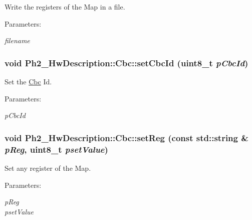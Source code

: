 Write the registers of the Map in a file. 

\begin{Desc}
\item[Parameters:]
\begin{description}
\item[{\em filename}]\end{description}
\end{Desc}
\hypertarget{class_ph2___hw_description_1_1_cbc_79864207a65830f49996220e612b00ae}{
\subsubsection[setCbcId]{\setlength{\rightskip}{0pt plus 5cm}void Ph2\_\-Hw\-Description::Cbc::set\-Cbc\-Id (uint8\_\-t {\em p\-Cbc\-Id})}}
\label{class_ph2___hw_description_1_1_cbc_79864207a65830f49996220e612b00ae}


Set the \hyperlink{class_ph2___hw_description_1_1_cbc}{Cbc} Id. 

\begin{Desc}
\item[Parameters:]
\begin{description}
\item[{\em p\-Cbc\-Id}]\end{description}
\end{Desc}
\hypertarget{class_ph2___hw_description_1_1_cbc_a5cd6d5dae570cebc56101c7871a0d7c}{
\subsubsection[setReg]{\setlength{\rightskip}{0pt plus 5cm}void Ph2\_\-Hw\-Description::Cbc::set\-Reg (const std::string \& {\em p\-Reg}, uint8\_\-t {\em pset\-Value})}}
\label{class_ph2___hw_description_1_1_cbc_a5cd6d5dae570cebc56101c7871a0d7c}


Set any register of the Map. 

\begin{Desc}
\item[Parameters:]
\begin{description}
\item[{\em p\-Reg}]\item[{\em pset\-Value}]\end{description}
\end{Desc}


